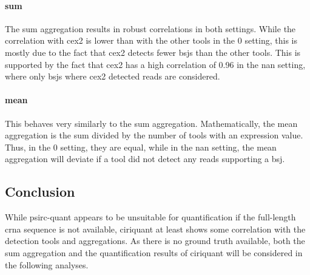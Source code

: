 \paragraph{sum}
The sum aggregation results in robust correlations in both settings.
While the correlation with \gls{cex2} is lower than with the other tools in the
0 setting, this is mostly due to the fact that \gls{cex2} detects fewer
\glspl{bsj} than the other tools.
This is supported by the fact that \gls{cex2} has a high correlation of 0.96 in
the \gls{nan} setting, where only \glspl{bsj} where \gls{cex2} detected reads
are considered.

\paragraph{mean}
This behaves very similarly to the sum aggregation.
Mathematically, the mean aggregation is the sum divided by the number of tools
with an expression value.
Thus, in the 0 setting, they are equal, while in the \gls{nan} setting, the
mean aggregation will deviate if a tool did not detect any reads supporting a
\gls{bsj}.

\subsection{Conclusion}

While \gls{psirc-quant} appears to be unsuitable for quantification if the
full-length \gls{crna} sequence is not available, \gls{ciriquant} at least
shows some correlation with the detection tools and aggregations.
As there is no ground truth available, both the sum aggregation and the
quantification results of \gls{ciriquant} will be considered in the following
analyses.
